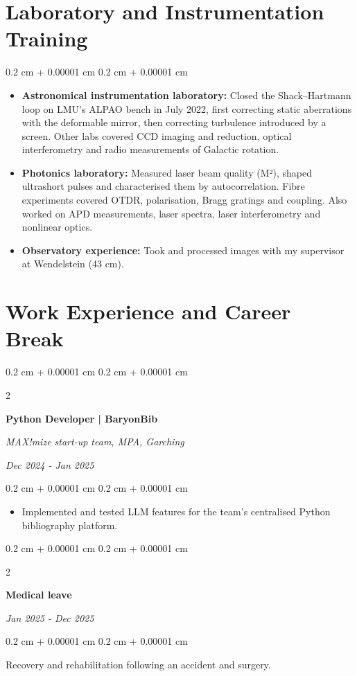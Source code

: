 \documentclass[10pt, a4paper]{article}
\newenvironment{highlights}{
    \begin{itemize}[
        topsep=0.10 cm,
        parsep=0.10 cm,
        partopsep=0pt,
        itemsep=0pt,
        leftmargin=0.4 cm + 10pt
    ]
}{
    \end{itemize}
} %
\newenvironment{onecolentry}{
    \begin{adjustwidth}{
        0.2 cm + 0.00001 cm
    }{
        0.2 cm + 0.00001 cm
    }
}{
    \end{adjustwidth}
} %
\newenvironment{twocolentry}[2][]{
    \onecolentry
    \def\secondColumn{#2}
    \setcolumnwidth{\fill, 4.5 cm}
    \begin{paracol}{2}
}{
    \switchcolumn \raggedleft \secondColumn
    \end{paracol}
    \endonecolentry
} %
\begin{document}
\section{Laboratory and Instrumentation Training}
\begin{onecolentry}
\begin{highlights}
\item \textbf{Astronomical instrumentation laboratory:} Closed the Shack–Hartmann loop on LMU’s \mbox{ALPAO} bench in July 2022, first correcting static aberrations with the deformable mirror, then correcting turbulence introduced by a screen. Other labs covered CCD imaging and reduction, optical interferometry and radio measurements of Galactic rotation.
\item \textbf{Photonics laboratory:} Measured laser beam quality (M²), shaped ultrashort pulses and characterised them by autocorrelation. Fibre experiments covered OTDR, polarisation, Bragg gratings and coupling. Also worked on APD measurements, laser spectra, laser interferometry and nonlinear optics.
\item \textbf{Observatory experience:} Took and processed images with my supervisor at Wendelstein (43 cm).
\end{highlights}
\end{onecolentry}
\section{Work Experience and Career Break}
\begin{twocolentry}{\textit{Dec 2024 - Jan 2025}}
{\large\textbf{Python Developer | BaryonBib}}

\textit{MAX!mize start-up team, MPA, Garching}
\end{twocolentry}
\begin{onecolentry}
\begin{highlights}
\item Implemented and tested LLM features for the team's centralised Python bibliography platform.
\end{highlights}
\end{onecolentry}
\begin{twocolentry}{\textit{Jan 2025 - Dec 2025}}
\textbf{Medical leave}
\end{twocolentry}
\begin{onecolentry}
Recovery and rehabilitation following an accident and surgery.
\end{onecolentry}
\end{document}
